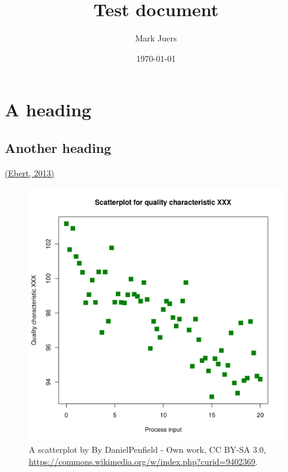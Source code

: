 \documentclass[10pt]{article}
\begin{document}
\title{Test document}



\author[1]{Mark Juers}%
%


\vspace{-1em}



  \date{\today}


\begingroup
\let\center\flushleft
\let\endcenter\endflushleft
\maketitle
\endgroup









\section*{A heading}

{\label{850151}}

\subsection*{Another heading}

{\label{367935}}

\hyperref[csl:1]{(Ebert, 2013)}

\par\null{}
\begin{figure}[h!]
\begin{center}
\includegraphics[width=0.70\columnwidth]{figures/scatterplot/scatterplot}
\caption{{A scatterplot by By DanielPenfield - Own work, CC BY-SA 3.0,
\url{https://commons.wikimedia.org/w/index.php?curid=9402369}.
{\label{286335}}%
}}
\end{center}
\end{figure}
\end{document}
